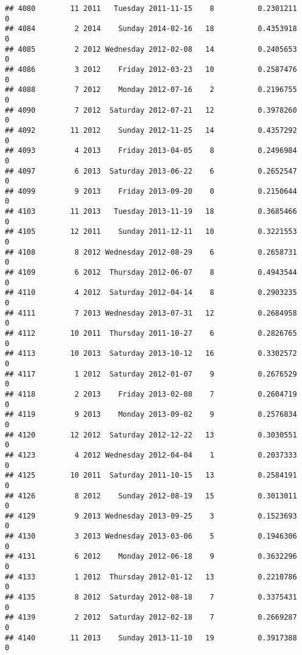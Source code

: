 \documentclass[
]{article}
\begin{document}
\begin{verbatim}
## 4080        11 2011   Tuesday 2011-11-15    8          0.2301211             0
## 4084         2 2014    Sunday 2014-02-16   18          0.4353918             0
## 4085         2 2012 Wednesday 2012-02-08   14          0.2405653             0
## 4086         3 2012    Friday 2012-03-23   10          0.2587476             0
## 4088         7 2012    Monday 2012-07-16    2          0.2196755             0
## 4090         7 2012  Saturday 2012-07-21   12          0.3978260             0
## 4092        11 2012    Sunday 2012-11-25   14          0.4357292             0
## 4093         4 2013    Friday 2013-04-05    8          0.2496984             0
## 4097         6 2013  Saturday 2013-06-22    6          0.2652547             0
## 4099         9 2013    Friday 2013-09-20    0          0.2150644             0
## 4103        11 2013   Tuesday 2013-11-19   18          0.3685466             0
## 4105        12 2011    Sunday 2011-12-11   10          0.3221553             0
## 4108         8 2012 Wednesday 2012-08-29    6          0.2658731             0
## 4109         6 2012  Thursday 2012-06-07    8          0.4943544             0
## 4110         4 2012  Saturday 2012-04-14    8          0.2903235             0
## 4111         7 2013 Wednesday 2013-07-31   12          0.2684958             0
## 4112        10 2011  Thursday 2011-10-27    6          0.2826765             0
## 4113        10 2013  Saturday 2013-10-12   16          0.3302572             0
## 4117         1 2012  Saturday 2012-01-07    9          0.2676529             0
## 4118         2 2013    Friday 2013-02-08    7          0.2604719             0
## 4119         9 2013    Monday 2013-09-02    9          0.2576834             0
## 4120        12 2012  Saturday 2012-12-22   13          0.3030551             0
## 4123         4 2012 Wednesday 2012-04-04    1          0.2037333             0
## 4125        10 2011  Saturday 2011-10-15   13          0.2584191             0
## 4126         8 2012    Sunday 2012-08-19   15          0.3013011             0
## 4129         9 2013 Wednesday 2013-09-25    3          0.1523693             0
## 4130         3 2013 Wednesday 2013-03-06    5          0.1946306             0
## 4131         6 2012    Monday 2012-06-18    9          0.3632296             0
## 4133         1 2012  Thursday 2012-01-12   13          0.2210786             0
## 4135         8 2012  Saturday 2012-08-18    7          0.3375431             0
## 4139         2 2012  Saturday 2012-02-18    7          0.2669287             0
## 4140        11 2013    Sunday 2013-11-10   19          0.3917388             0

\end{verbatim}
\end{document}
